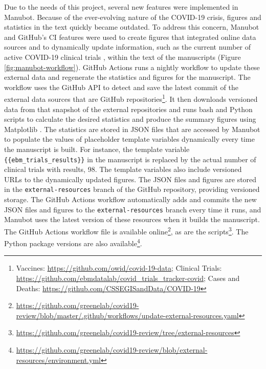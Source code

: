 \documentclass[twocolumn]{ceurart}
\begin{document}
Due to the needs of this project, several new features were implemented in Manubot.
Because of the ever-evolving nature of the COVID-19 crisis, figures and statistics in the text quickly became outdated.
To address this concern, Manubot and GitHub's CI features were used to create figures that integrated online data sources and to dynamically update information, such as the current number of active COVID-19 clinical trials \citep{cifK9B8t}, within the text of the manuscripts (Figure \ref{fig:manubot-workflow}).
GitHub Actions runs a nightly workflow to update these external data and regenerate the statistics and figures for the manuscript.
The workflow uses the GitHub API to detect and save the latest commit of the external data sources that are GitHub repositories\footnote{Vaccines: \url{https://github.com/owid/covid-19-data}; Clinical Trials: \url{https://github.com/ebmdatalab/covid_trials_tracker-covid}; Cases and Deaths: \url{https://github.com/CSSEGISandData/COVID-19}}.
It then downloads versioned data from that snapshot of the external repositories and runs bash and Python scripts to calculate the desired statistics and produce the summary figures using Matplotlib \citep{1026Gxdsi}.
The statistics are stored in JSON files that are accessed by Manubot to populate the values of placeholder template variables dynamically every time the manuscript is built.
For instance, the template variable \texttt{\{\{ebm\_trials\_results\}\}} in the manuscript is replaced by the actual number of clinical trials with results, 98.
The template variables also include versioned URLs to the dynamically updated figures.
The JSON files and figures are stored in the \texttt{external-resources} branch of the GitHub repository, providing versioned storage.
The GitHub Actions workflow automatically adds and commits the new JSON files and figures to the \texttt{external-resources} branch every time it runs, and Manubot uses the latest version of these resources when it builds the manuscript.
The GitHub Actions workflow file is available online\footnote{\url{https://github.com/greenelab/covid19-review/blob/master/.github/workflows/update-external-resources.yaml}}, as are the scripts\footnote{\url{https://github.com/greenelab/covid19-review/tree/external-resources}}.
The Python package versions are also available\footnote{\url{https://github.com/greenelab/covid19-review/blob/external-resources/environment.yml}}.
\end{document}
